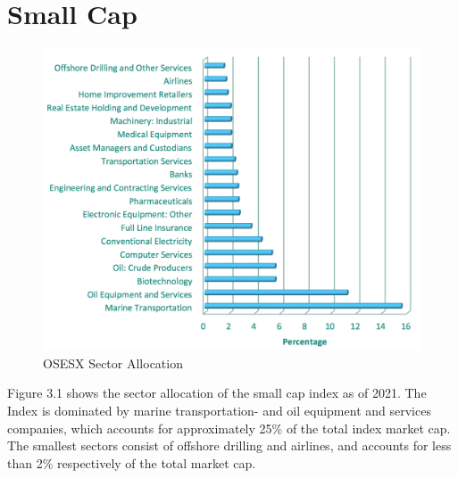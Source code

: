 \section{Small Cap}
\begin{figure}[H]
\centering
\includegraphics [scale=0.44,angle=360]{figures/smallsector.png}
\caption{OSESX Sector Allocation \cite{euronext}}
\label{fig:smallsector}
\end{figure}
\indent\newline 
Figure 3.1 shows the sector allocation of the small cap index as of 2021. The Index is dominated by marine transportation- and oil equipment and services companies, which accounts for approximately 25\% of the total index market cap. The smallest sectors consist of offshore drilling and airlines, and accounts for less than 2\% respectively of the total market cap. 

\indent\newline 
\begin{table}[ht]
\centering
{}
\caption{Small cap summary statistics}
\end{table}

